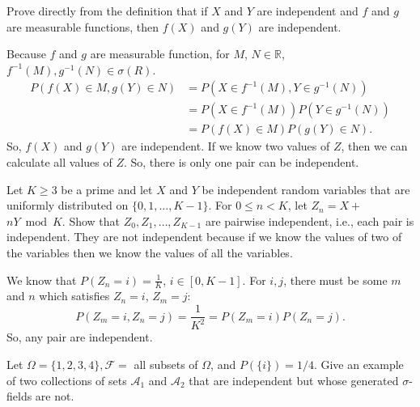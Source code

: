 \documentclass[en, normal, 11pt, black]{elegantnote}
\newenvironment{exercise}[1]{\begin{tcolorbox}[colback=black!15, colframe=black!80, breakable, title=#1]}{\end{tcolorbox}}
\renewenvironment{proof}{\begin{tcolorbox}[colback=white, colframe=black!50, breakable, title=Proof. ]\setlength{\parskip}{0.8em}}{\,\\\rightline{$\square$}\end{tcolorbox}}
\begin{document}
    \begin{exercise}{2.1.6}
        Prove directly from the definition that if $X$ and $Y$ are independent and $f$ and $g$ are measurable functions, then $f(X)$ and $g(Y)$ are independent. 
    \end{exercise}

    \begin{proof}
        Because $f$ and $g$ are measurable function, for $M$, $N\in\mathbb{R}$, $f^{-1}(M), g^{-1}(N)\in\sigma(R)$. 
        \[
            \begin{aligned}
                P(f(X) \in M, g(Y) \in N) &=P\left(X \in f^{-1}(M), Y \in g^{-1}(N)\right) \\
                &=P\left(X \in f^{-1}(M)\right) P\left(Y \in g^{-1}(N)\right) \\
                &=P(f(X) \in M) P(g(Y) \in N). 
            \end{aligned}
        \]
        So, $f(X)$ and $g(Y)$ are independent. If we know two values of $Z$, then we can calculate all values of $Z$. So, there is only one pair can be independent. 
    \end{proof}

    \begin{exercise}{2.1.7}
        Let $K \geqslant 3$ be a prime and let $X$ and $Y$ be independent random variables that are uniformly distributed on $\{0,1, \ldots, K-1\} .$ For $0 \leqslant n<K$, let $Z_{n}=X+$ $n Y \bmod K$. Show that $Z_{0}, Z_{1}, \ldots, Z_{K-1}$ are pairwise independent, i.e., each pair is independent. They are not independent because if we know the values of two of the variables then we know the values of all the variables. 
    \end{exercise}

    \begin{proof}
        We know that $P(Z_n=i)=\frac{1}{K}$, $i\in[0,K-1]$. For $i, j$, there must be some $m$ and $n$ which satisfies $Z_n=i$, $Z_m=j$: 
        \[
            P(Z_m=i, Z_n=j)=\frac{1}{K^2}=P(Z_m=i)P(Z_n=j). 
        \]
        So, any pair are independent. 
    \end{proof}
    
    \begin{exercise}{2.1.9}
        Let $\Omega=\{1,2,3,4\}, \mathcal{F}=$ all subsets of $\Omega$, and $P(\{i\})=1 / 4$. Give an example of two collections of sets $\mathcal{A}_{1}$ and $\mathcal{A}_{2}$ that are independent but whose generated $\sigma$-fields are not. 
    \end{exercise}
\end{document}
